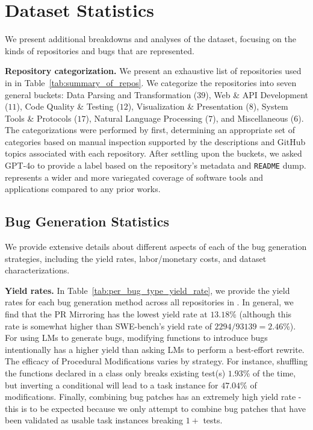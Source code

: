 \section{Dataset Statistics}
\label{appx:dataset}
We present additional breakdowns and analyses of the \bugs{} dataset, focusing on the kinds of repositories and bugs that are represented.

\textbf{Repository categorization.}
We present an exhaustive list of repositories used in \bugs{} in Table~\ref{tab:summary_of_repos}.
We categorize the repositories into seven general buckets: Data Parsing and Transformation ($39$), Web \& API Development ($11$), Code Quality \& Testing ($12$), Visualization \& Presentation ($8$), System Tools \& Protocols ($17$), Natural Language Processing ($7$), and Miscellaneous ($6$).
The categorizations were performed by first, determining an appropriate set of categories based on manual inspection supported by the descriptions and GitHub topics associated with each repository.
After settling upon the buckets, we asked GPT-4o to provide a label based on the repository's metadata and \texttt{README} dump.
\bugs{} represents a wider and more variegated coverage of software tools and applications compared to any prior works.



\subsection{Bug Generation Statistics}
\label{appx:dataset:bug_gen_stats}
We provide extensive details about different aspects of each of the bug generation strategies, including the yield rates, labor/monetary costs, and dataset characterizations.

\textbf{Yield rates.}
In Table~\ref{tab:per_bug_type_yield_rate}, we provide the yield rates for each bug generation method across all repositories in \bugs{}.
In general, we find that the PR Mirroring has the lowest yield rate at $13.18$\% (although this rate is somewhat higher than SWE-bench's yield rate of $2294/93139 = 2.46$\%).
For using LMs to generate bugs, modifying functions to introduce bugs intentionally has a higher yield than asking LMs to perform a best-effort rewrite.
The efficacy of Procedural Modifications varies by strategy.
For instance, shuffling the functions declared in a class only breaks existing test(s) $1.93$\% of the time, but inverting a conditional will lead to a task instance for $47.04$\% of modifications.
Finally, combining bug patches has an extremely high yield rate - this is to be expected because we only attempt to combine bug patches that have been validated as usable task instances breaking $1+$ tests.

